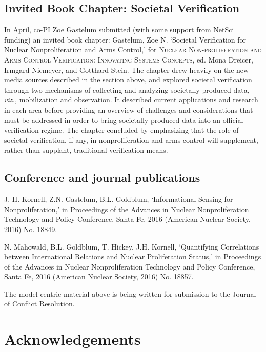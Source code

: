 \documentclass{article} %
\begin{document}
{\subsection{Invited Book Chapter: Societal Verification}
In April, co-PI Zoe Gastelum submitted (with some support from NetSci funding) an invited book chapter: Gastelum, Zoe N. `Societal Verification for Nuclear Nonproliferation and Arms Control,' for \textsc{Nuclear Non-proliferation and Arms Control Verification: Innovating Systems Concepts}, ed. Mona Dreicer, Irmgard Niemeyer, and Gotthard Stein. The chapter drew heavily on the new media sources described in the section above, and explored societal verification through two mechanisms of collecting and analyzing societally-produced data, \textit{viz.,} mobilization and observation. It described current applications and research in each area before providing an overview of challenges and considerations that must be addressed in order to bring societally-produced data into an official verification regime. The chapter concluded by emphasizing that the role of societal verification, if any, in nonproliferation and arms control will supplement, rather than supplant, traditional verification means.

\subsection{Conference and journal publications}
J. H. Kornell, Z.N. Gastelum, B.L. Goldblum, `Informational Sensing for Nonproliferation,' in Proceedings of the Advances in Nuclear Nonproliferation Technology and Policy Conference, Santa Fe, 2016 (American Nuclear Society, 2016) No. 18849.

N. Mahowald, B.L. Goldblum, T. Hickey, J.H. Kornell, `Quantifying Correlations between International Relations and Nuclear Proliferation Status,' in Proceedings of the Advances in Nuclear Nonproliferation Technology and Policy Conference, Santa Fe, 2016 (American Nuclear Society, 2016) No. 18857.

The model-centric material above is being written for submission to the Journal of Conflict Resolution. 

\pagebreak
\section*{Acknowledgements}

}
\end{document}
